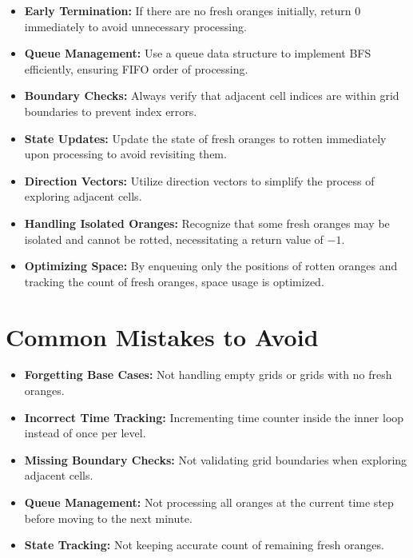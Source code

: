\begin{itemize}
    \item \textbf{Early Termination:} If there are no fresh oranges initially, return \(0\) immediately to avoid unnecessary processing.
    
    \item \textbf{Queue Management:} Use a queue data structure to implement BFS efficiently, ensuring FIFO order of processing.
    
    \item \textbf{Boundary Checks:} Always verify that adjacent cell indices are within grid boundaries to prevent index errors.
    
    \item \textbf{State Updates:} Update the state of fresh oranges to rotten immediately upon processing to avoid revisiting them.
    
    \item \textbf{Direction Vectors:} Utilize direction vectors to simplify the process of exploring adjacent cells.
    
    \item \textbf{Handling Isolated Oranges:} Recognize that some fresh oranges may be isolated and cannot be rotted, necessitating a return value of \(-1\).
    
    \item \textbf{Optimizing Space:} By enqueuing only the positions of rotten oranges and tracking the count of fresh oranges, space usage is optimized.
\end{itemize}

\section*{Common Mistakes to Avoid}
\begin{itemize}
    \item \textbf{Forgetting Base Cases:} Not handling empty grids or grids with no fresh oranges.
    \item \textbf{Incorrect Time Tracking:} Incrementing time counter inside the inner loop instead of once per level.
    \item \textbf{Missing Boundary Checks:} Not validating grid boundaries when exploring adjacent cells.
    \item \textbf{Queue Management:} Not processing all oranges at the current time step before moving to the next minute.
    \item \textbf{State Tracking:} Not keeping accurate count of remaining fresh oranges.
\end{itemize}

